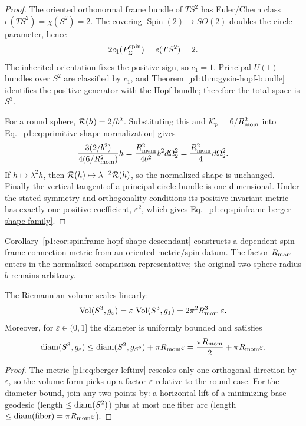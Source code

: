 \documentclass[11pt]{article}
\begin{document}
\begin{proof}
The oriented orthonormal frame bundle of \(TS^2\) has Euler/Chern class
\(e(TS^2)=\chi(S^2)=2\).  The covering
\(\operatorname{Spin}(2)\to SO(2)\) doubles the circle parameter, hence
\[
 2c_1(P^{\rm spin}_{\Sigma})=e(TS^2)=2.
\]
The inherited orientation fixes the positive sign, so \(c_1=1\).  Principal
\(U(1)\)-bundles over \(S^2\) are classified by \(c_1\), and
Theorem~\ref{p1:thm:gysin-hopf-bundle} identifies the positive generator with
the Hopf bundle; therefore the total space is \(S^3\).

For a round sphere, \(\mathcal R(h)=2/b^2\).  Substituting this and
\(\mathcal K_p=6/R_{\mathrm{mom}}^2\) into
Eq.~\eqref{p1:eq:primitive-shape-normalization} gives
\[
 \frac{3(2/b^2)}{4(6/R_{\mathrm{mom}}^2)}h
 =\frac{R_{\mathrm{mom}}^2}{4b^2}b^2d\Omega_2^2
 =\frac{R_{\mathrm{mom}}^2}{4}d\Omega_2^2.
\]
If \(h\mapsto\lambda^2h\), then
\(\mathcal R(h)\mapsto\lambda^{-2}\mathcal R(h)\), so the normalized shape is
unchanged.  Finally the vertical tangent of a principal circle bundle is
one-dimensional.  Under the stated symmetry and orthogonality conditions its
positive invariant metric has exactly one positive coefficient,
\(\varepsilon^2\), which gives
Eq.~\eqref{p1:eq:spinframe-berger-shape-family}.
\end{proof}

\begin{remark}
\label{p1:rem:spinframe-hopf-shape-scope}
Corollary~\ref{p1:cor:spinframe-hopf-shape-descendant} constructs a
dependent spin-frame connection metric from an oriented metric/spin datum.
The factor \(R_{\mathrm{mom}}\) enters in the normalized comparison representative;
the original two-sphere radius \(b\) remains arbitrary.
\end{remark}

\begin{corollary}\label{p1:cor:berger-vol-diam}
The Riemannian volume scales linearly:
\[
\operatorname{Vol}(S^3,g_\varepsilon)=\varepsilon\,\operatorname{Vol}(S^3,g_1)=2\pi^2 R_{\mathrm{mom}}^3\,\varepsilon.
\]
Moreover, for $\varepsilon\in(0,1]$ the diameter is uniformly bounded and satisfies
\[
\operatorname{diam}(S^3,g_\varepsilon)\le \operatorname{diam}(S^2,g_{S^2})+\pi R_{\mathrm{mom}} \varepsilon=\frac{\pi R_{\mathrm{mom}}}{2}+\pi R_{\mathrm{mom}} \varepsilon.
\]
\end{corollary}

\begin{proof}
The metric \eqref{p1:eq:berger-leftinv} rescales only one orthogonal direction by $\varepsilon$, so the volume form
picks up a factor $\varepsilon$ relative to the round case. For the diameter bound, join any two points by:
a horizontal lift of a minimizing base geodesic (length $\le\operatorname{diam}(S^2)$) plus at most one fiber arc
(length $\le \operatorname{diam}(\text{fiber})=\pi R_{\mathrm{mom}} \varepsilon$).
\end{proof}
\end{document}
